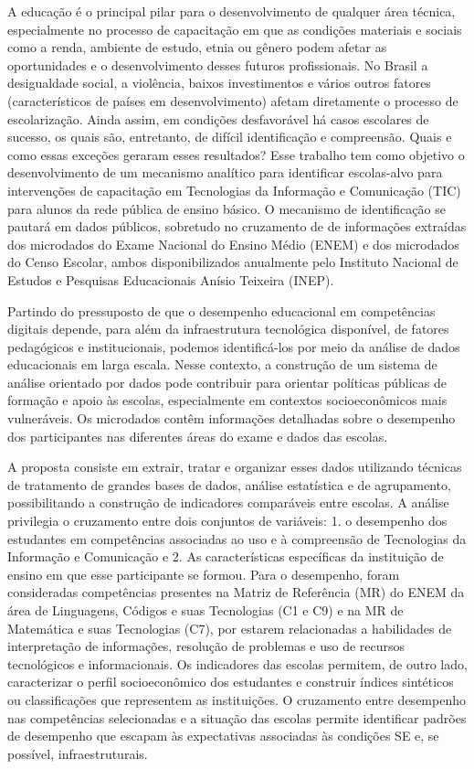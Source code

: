 \documentclass[12pt]{article}
\begin{document}
A educação é o principal pilar para o desenvolvimento de qualquer área técnica, especialmente no processo de capacitação em que as condições materiais e sociais como a renda, ambiente de estudo, etnia ou gênero podem afetar as oportunidades e o desenvolvimento desses futuros profissionais. No Brasil a desigualdade social, a violência, baixos investimentos e vários outros fatores (característicos de países em desenvolvimento) afetam diretamente o processo de escolarização. Ainda assim, em condições desfavorável há casos escolares de sucesso, os quais são, entretanto, de difícil identificação e compreensão. Quais e como essas exceções geraram esses resultados? Esse trabalho tem como objetivo o desenvolvimento de um mecanismo analítico para identificar escolas-alvo para intervenções de capacitação em Tecnologias da Informação e Comunicação (TIC) para alunos da rede pública de ensino básico. O mecanismo de identificação se pautará em dados públicos, sobretudo no cruzamento de de informações extraídas dos microdados do Exame Nacional do Ensino Médio (ENEM) e dos microdados do Censo Escolar, ambos disponibilizados anualmente pelo Instituto Nacional de Estudos e Pesquisas Educacionais Anísio Teixeira (INEP).

Partindo do pressuposto de que o desempenho educacional em competências digitais depende, para além da infraestrutura tecnológica disponível, de fatores pedagógicos e institucionais, podemos identificá-los por meio da análise de dados educacionais em larga escala. Nesse contexto, a construção de um sistema de análise orientado por dados pode contribuir para orientar políticas públicas de formação e apoio às escolas, especialmente em contextos socioeconômicos mais vulneráveis. Os microdados contêm informações detalhadas sobre o desempenho dos participantes nas diferentes áreas do exame e dados das escolas.

A proposta consiste em extrair, tratar e organizar esses dados utilizando técnicas de tratamento de grandes bases de dados, análise estatística e de agrupamento, possibilitando a construção de indicadores comparáveis entre escolas. A análise privilegia o cruzamento entre dois conjuntos de variáveis: 1. o desempenho dos estudantes em competências associadas ao uso e à compreensão de Tecnologias da Informação e Comunicação e 2. As características específicas da instituição de ensino em que esse participante se formou. Para o desempenho, foram consideradas competências presentes na Matriz de Referência (MR) do ENEM da área de Linguagens, Códigos e suas Tecnologias (C1 e C9) e na MR de Matemática e suas Tecnologias (C7), por estarem relacionadas a habilidades de interpretação de informações, resolução de problemas e uso de recursos tecnológicos e informacionais. Os indicadores das escolas permitem, de outro lado, caracterizar o perfil socioeconômico dos estudantes e construir índices sintéticos ou classificações que representem as instituições. O cruzamento entre desempenho nas competências selecionadas e a situação das escolas permite identificar padrões de desempenho que escapam às expectativas associadas às condições SE e, se possível, infraestruturais.
\end{document}
